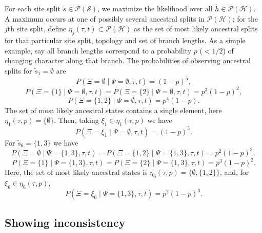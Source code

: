 \documentclass{article}
\newcommand{\siteSplit}{\tilde{s}}
\newcommand{\siteSplitSet}{\mathcal{S}}
\newcommand{\ancestralSplit}{\tilde{h}}
\newcommand{\ancestralSplitSet}{\mathcal{H}}
\newcommand{\ancestralSplitPartition}{\eta}
\newcommand{\siteSplitRV}{\Psi}
\newcommand{\ancestralSplitRV}{\Xi}
\begin{document}
For each site split $\siteSplit\in\mathcal{P}(\siteSplitSet)$, we maximize the likelihood over all $\ancestralSplit\in\mathcal{P}(\ancestralSplitSet)$.
A maximum occurs at one of possibly several ancestral splits in $\mathcal{P}(\ancestralSplitSet)$; for the $j$th site split, define $\ancestralSplitPartition_j(\tau, t)\subset\mathcal{P}(\ancestralSplitSet)$ as the set of most likely ancestral splits for that particular site split, topology and set of branch lengths.
As a simple example, say all branch lengths correspond to a probability $p$ ($< 1/2$) of changing character along that branch.
The probabilities of observing ancestral splits for $\siteSplit_1=\emptyset$ are
$$
P(\ancestralSplitRV=\emptyset \mid \siteSplitRV=\emptyset, \tau, t) =
(1-p)^5,
$$
$$
P(\ancestralSplitRV=\{1\} \mid \siteSplitRV=\emptyset, \tau, t) =
P(\ancestralSplitRV=\{2\} \mid \siteSplitRV=\emptyset, \tau, t) =
p^3(1-p)^2,
$$
$$
P(\ancestralSplitRV=\{1,2\} \mid \siteSplitRV=\emptyset, \tau, t) =
p^4(1-p).
$$
The set of most likely ancestral states contains a single element, here $\ancestralSplitPartition_1(\tau, p)=\{\emptyset\}$.
Then, taking $\xi_1\in\ancestralSplitPartition_1(\tau, p)$ we have
$$
P(\ancestralSplitRV=\xi_1 \mid \siteSplitRV=\emptyset, \tau, t) =
(1-p)^5.
$$
For $\siteSplit_6=\{1,3\}$ we have
$$
P(\ancestralSplitRV=\emptyset \mid \siteSplitRV=\{1,3\}, \tau, t) =
P(\ancestralSplitRV=\{1,2\} \mid \siteSplitRV=\{1,3\}, \tau, t) =
p^2(1-p)^3,
$$
$$
P(\ancestralSplitRV=\{1\} \mid \siteSplitRV=\{1,3\}, \tau, t) =
P(\ancestralSplitRV=\{2\} \mid \siteSplitRV=\{1,3\}, \tau, t) =
p^3(1-p)^2.
$$
Here, the set of most likely ancestral states is $\ancestralSplitPartition_6(\tau, p)=\{\emptyset,\{1,2\}\}$, and, for $\xi_6\in\ancestralSplitPartition_6(\tau, p)$,
$$
P(\ancestralSplitRV=\xi_6 \mid \siteSplitRV=\{1,3\}, \tau, t) =
p^2(1-p)^3.
$$

\subsection{Showing inconsistency}
\end{document}
